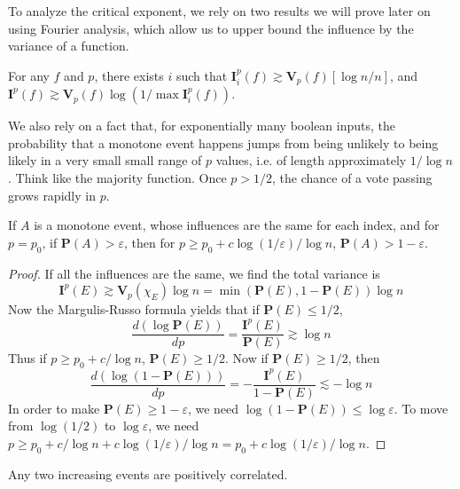 To analyze the critical exponent, we rely on two results we will prove later on using Fourier analysis, which allow us to upper bound the influence by the variance of a function.

\begin{theorem}
    For any $f$ and $p$, there exists $i$ such that $\mathbf{I}_i^p(f) \gtrsim \mathbf{V}_p(f) [\log n / n]$, and $\mathbf{I}^p(f) \gtrsim \mathbf{V}_p(f) \log(1/\max \mathbf{I}_i^p(f))$.
\end{theorem}

We also rely on a fact that, for exponentially many boolean inputs, the probability that a monotone event happens jumps from being unlikely to being likely in a very small small range of $p$ values, i.e. of length approximately $1/\log n$. Think like the majority function. Once $p > 1/2$, the chance of a vote passing grows rapidly in $p$.

\begin{theorem}
    If $A$ is a monotone event, whose influences are the same for each index, and for $p = p_0$, if $\mathbf{P}(A) > \varepsilon$, then for $p \geq p_0 + c \log(1/\varepsilon)/\log n$, $\mathbf{P}(A) > 1 - \varepsilon$.
\end{theorem}

\begin{proof}
    If all the influences are the same, we find the total variance is
    \[ \mathbf{I}^p(E) \gtrsim \mathbf{V}_p(\chi_E) \log n = \min (\mathbf{P}(E), 1 - \mathbf{P}(E)) \log n \]
    Now the Margulis-Russo formula yields that if $\mathbf{P}(E) \leq 1/2$,
    \[ \frac{d(\log \mathbf{P}(E))}{dp} = \frac{\mathbf{I}^p(E)}{\mathbf{P}(E)} \gtrsim \log n \]
    Thus if $p \geq p_0 + c/\log n$, $\mathbf{P}(E) \geq 1/2$. Now if $\mathbf{P}(E) \geq 1/2$, then
    \[ \frac{d(\log(1 - \mathbf{P}(E)))}{dp} = - \frac{\mathbf{I}^p(E)}{1 - \mathbf{P}(E)} \lesssim - \log n \]
    In order to make $\mathbf{P}(E) \geq 1-\varepsilon$, we need $\log(1 - \mathbf{P}(E)) \leq \log \varepsilon$. To move from $\log(1/2)$ to $\log \varepsilon$, we need $p \geq p_0 + c/\log n + c \log(1/\varepsilon)/\log n = p_0 + c \log(1/\varepsilon)/\log n$.
\end{proof}

\begin{theorem}[FKG]
    Any two increasing events are positively correlated.
\end{theorem}

